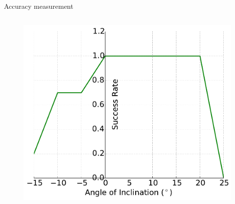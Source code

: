 \documentclass[aspectratio=43,11pt,xcolor={dvipsnames}]{beamer}
\begin{document}
\begin{frame}{Accuracy measurement}
\begin{columns}[t]
		\begin{column}{0.5\textwidth}
			\begin{figure}
				\includegraphics[width=\textwidth]{success_rate}
			\end{figure}
		\end{column}
	\end{columns}
\end{frame}
\end{document}

